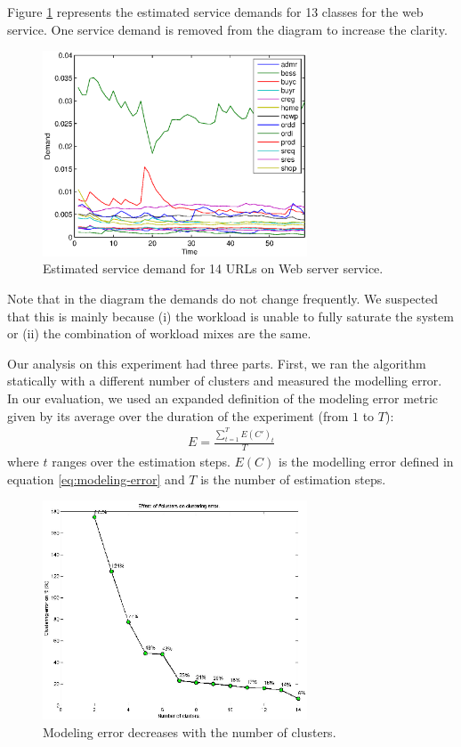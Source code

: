 		Figure \ref{fig:estimated-demands-casestudy1} represents the estimated service demands for 13 classes for the web service. One service demand is removed from the diagram to increase the clarity. 
 \begin{figure}[htbp]
	\centering
	\includegraphics[width=0.7\textwidth]{image/demand13_estimated_kamlan.eps}
	\caption[A sample example of estimated service demand of 14 classes on a single service.]{Estimated service demand for 14 URLs on Web server service.}
	\label{fig:estimated-demands-casestudy1}
\end{figure}
Note that in the diagram the demands do not change frequently. We suspected that this is mainly because (i) the workload is unable to fully saturate the system or (ii) the combination of workload mixes are the same.
      
  Our analysis on this experiment had three parts. First, we ran the algorithm statically with a different number of clusters and measured the modelling error. In our evaluation, we used an expanded definition of the modeling error metric given by its average over the duration of the experiment (from $1$ to $T$): 
 \begin{align} 
 E=\frac{\sum^T_{t=1}{E(C')_{t}}}{T} 
  \end{align} 
where $t$ ranges over the estimation steps. $E(C)$ is the modelling error defined in equation \ref{eq:modeling-error} and $T$ is the number of estimation steps. 
\begin{figure}[htbp]
	\centering
	\includegraphics[width=0.7\textwidth]{image/modeling-error-vs-num-cluster.eps}
	\caption[The relationship between the modeling error and the number of clusters.]{Modeling error decreases with the number of clusters.}
	\label{fig:modeling-error-decreases}
\end{figure}

